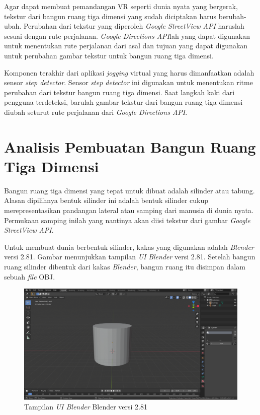 Agar dapat membuat pemandangan VR seperti dunia nyata yang bergerak, tekstur dari bangun ruang tiga dimensi yang sudah diciptakan harus berubah-ubah. Perubahan dari tekstur yang diperoleh \textit{Google StreetView API} haruslah sesuai dengan rute perjalanan. \textit{Google Directions API}lah yang dapat digunakan untuk menentukan rute perjalanan dari asal dan tujuan yang dapat digunakan untuk perubahan gambar tekstur untuk bangun ruang tiga dimensi. 

Komponen terakhir dari aplikasi \textit{jogging} virtual yang harus dimanfaatkan adalah sensor \textit{step detector}. Sensor \textit{step detector} ini digunakan untuk menentukan ritme perubahan dari tekstur bangun ruang tiga dimensi. Saat langkah kaki dari pengguna terdeteksi, barulah gambar tekstur dari bangun ruang tiga dimensi diubah seturut rute perjalanan dari \textit{Google Directions API}.

\section{Analisis Pembuatan Bangun Ruang Tiga Dimensi}

Bangun ruang tiga dimensi yang tepat untuk dibuat adalah silinder atau tabung. Alasan dipilihnya bentuk silinder ini adalah bentuk silinder cukup merepresentasikan pandangan lateral atau samping dari manusia di dunia nyata. Permukaan samping inilah yang nantinya akan diisi tekstur dari gambar \textit{Google StreetView API}. 

Untuk membuat dunia berbentuk silinder, kakas yang digunakan adalah \textit{Blender} versi 2.81. Gambar menunjukkan tampilan \textit{UI} \textit{Blender} versi 2.81. Setelah bangun ruang silinder dibentuk dari kakas \textit{Blender}, bangun ruang itu disimpan dalam sebuah \textit{file} OBJ. 



\begin{figure}[h]
	\centering
		\includegraphics[scale=0.4]{Gambar/blender.png}
	\caption{Tampilan \textit{UI Blender} Blender versi 2.81}
	\label{fig:blender-ui}
\end{figure}

